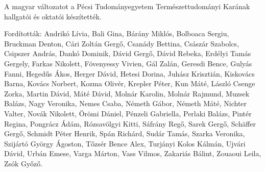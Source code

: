 {
A magyar változatot a Pécsi Tudományegyetem Természettudományi Karának hallgatói és oktatói készítették.

Fordították: Andrikó Lívia, Bali Gina, Bárány Miklós, Bolboaca Sergiu, Bruckman Denton,
Cári Zoltán Gergő, Csanády Bettina, Császár Szabolcs, Csipszer András, Dankó Dominik, Dávid Gergő, Dávid Rebeka, Erdélyi Tamás Gergely,
Farkas Nikolett, Fövenyessy Vivien, Gál Zalán, Geresdi Bence, Gulyás Fanni,
Hegedűs Ákos, Herger Dávid, Hetesi Dorina,
Juhász Krisztián, Kiskovács Barna, Kovács Norbert, Kozma Olivér, Krepler Péter, Kun Máté,
László Csenge Zorka, Martin Dávid, Máté Dávid, Molnár Karolin, Molnár Rajmund, Muzsek Balázs,
Nagy Veronika, Nemes Csaba, Németh Gábor, Németh Máté, Nichter Valter, Novák Nikolett,
Örömi Dániel,
Pénzeli Gabriella, Perlaki Balázs, Pintér Regina, Pongrácz Ádám,
Rózsavölgyi Kitti,
Sáfrány Regő, Sarek Gergő, Schäffer Gergő, Schmidt Péter Henrik, Spán Richárd, Sudár Tamás,
Szarka Veronika, Szijártó György Ágoston,
Tőzsér Bence Alex, Turjányi Kolos Kálmán, Ujvári Dávid, Urbán Emese,
Varga Márton, Vass Vilmos, Zakariás Bálint, Zouaoui Leila, Zsók Győző.
}